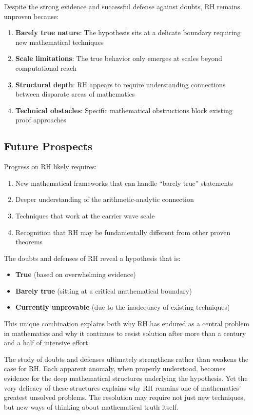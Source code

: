 Despite the strong evidence and successful defense against doubts, RH remains unproven because:

\begin{enumerate}
\item \textbf{Barely true nature}: The hypothesis sits at a delicate boundary requiring new mathematical techniques
\item \textbf{Scale limitations}: The true behavior only emerges at scales beyond computational reach
\item \textbf{Structural depth}: RH appears to require understanding connections between disparate areas of mathematics
\item \textbf{Technical obstacles}: Specific mathematical obstructions block existing proof approaches
\end{enumerate}

\subsection{Future Prospects}
\label{subsec:future_prospects}

\begin{conjecture}
Progress on RH likely requires:
\begin{enumerate}
\item New mathematical frameworks that can handle ``barely true'' statements
\item Deeper understanding of the arithmetic-analytic connection
\item Techniques that work at the carrier wave scale
\item Recognition that RH may be fundamentally different from other proven theorems
\end{enumerate}
\end{conjecture}

\begin{remark}
The doubts and defenses of RH reveal a hypothesis that is:
\begin{itemize}
\item \textbf{True} (based on overwhelming evidence)
\item \textbf{Barely true} (sitting at a critical mathematical boundary)
\item \textbf{Currently unprovable} (due to the inadequacy of existing techniques)
\end{itemize}

This unique combination explains both why RH has endured as a central problem in mathematics and why it continues to resist solution after more than a century and a half of intensive effort.
\end{remark}

The study of doubts and defenses ultimately strengthens rather than weakens the case for RH. Each apparent anomaly, when properly understood, becomes evidence for the deep mathematical structures underlying the hypothesis. Yet the very delicacy of these structures explains why RH remains one of mathematics' greatest unsolved problems. The resolution may require not just new techniques, but new ways of thinking about mathematical truth itself.